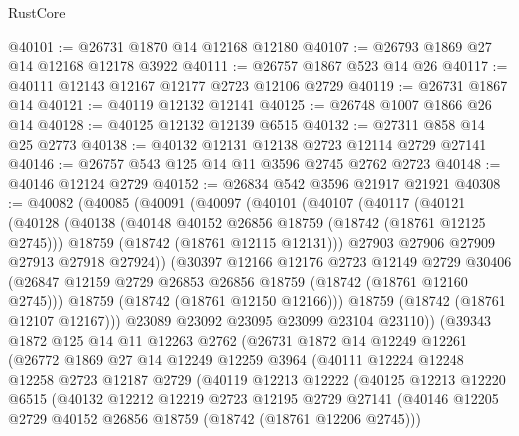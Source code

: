 \begin{lexlean}{RustCore}
\begin{coremodule}
@40101 := @26731 @1870 @14 @12168 @12180
@40107 := @26793 @1869 @27 @14 @12168 @12178 @3922
@40111 := @26757 @1867 @523 @14 @26
@40117 := @40111 @12143 @12167 @12177 @2723 @12106 @2729
@40119 := @26731 @1867 @14
@40121 := @40119 @12132 @12141
@40125 := @26748 @1007 @1866 @26 @14
@40128 := @40125 @12132 @12139 @6515
@40132 := @27311 @858 @14 @25 @2773
@40138 := @40132 @12131 @12138 @2723 @12114 @2729 @27141
@40146 := @26757 @543 @125 @14 @11 @3596 @2745 @2762 @2723
@40148 := @40146 @12124 @2729
@40152 := @26834 @542 @3596 @21917 @21921
@40308 := @40082
    (@40085
      (@40091
        (@40097
          (@40101
            (@40107
              (@40117
                (@40121
                  (@40128
                    (@40138
                      (@40148 @40152 @26856 @18759 (@18742 (@18761 @12125 @2745)))
                      @18759
                      (@18742 (@18761 @12115 @12131)))
                    @27903
                    @27906
                    @27909
                    @27913
                    @27918
                    @27924))
                (@30397
                  @12166
                  @12176
                  @2723
                  @12149
                  @2729
                  @30406
                  (@26847 @12159 @2729 @26853 @26856 @18759 (@18742 (@18761 @12160 @2745)))
                  @18759
                  (@18742 (@18761 @12150 @12166)))
                @18759
                (@18742 (@18761 @12107 @12167)))
              @23089
              @23092
              @23095
              @23099
              @23104
              @23110))
          (@39343
            @1872
            @125
            @14
            @11
            @12263
            @2762
            (@26731
              @1872
              @14
              @12249
              @12261
              (@26772
                @1869
                @27
                @14
                @12249
                @12259
                @3964
                (@40111
                  @12224
                  @12248
                  @12258
                  @2723
                  @12187
                  @2729
                  (@40119
                    @12213
                    @12222
                    (@40125
                      @12213
                      @12220
                      @6515
                      (@40132
                        @12212
                        @12219
                        @2723
                        @12195
                        @2729
                        @27141
                        (@40146 @12205 @2729 @40152 @26856 @18759 (@18742 (@18761 @12206 @2745)))

\end{coremodule}
\end{lexlean}

